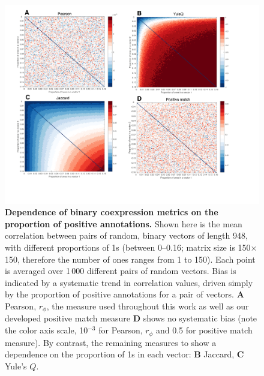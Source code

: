 \documentclass[10pt,letterpaper]{article}
\begin{document}
{%

\begin{figure}[h]
\centering
    \includegraphics[width=1\textwidth]{CoexpressionMeasures.pdf}
\caption{
\label{fig:S_propOnes}
\textbf{Dependence of binary coexpression metrics on the proportion of positive annotations.}
Shown here is the mean correlation between pairs of random, binary vectors of length 948, with different proportions of 1s (between 0--0.16; matrix size is 150$\times$150, therefore the number of ones ranges from 1 to 150).
Each point is averaged over 1\,000 different pairs of random vectors.
Bias is indicated by a systematic trend in correlation values, driven simply by the proportion of positive annotations for a pair of vectors.
\textbf{A} Pearson, $r_\phi$, the measure used throughout this work as well as our developed positive match measure \textbf{D} shows no systematic bias (note the color axis scale, 10$^{-3}$ for Pearson, $r_\phi$ and 0.5 for positive match measure).
By contrast, the remaining measures to show a dependence on the proportion of 1s in each vector:
\textbf{B} Jaccard,
\textbf{C} Yule's $Q$.
}
\end{figure}

}
\end{document}
